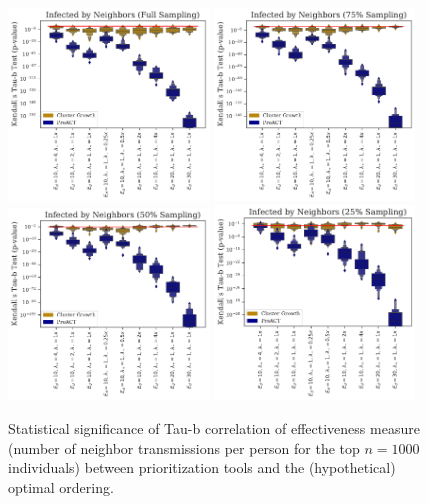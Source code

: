 \documentclass[a4paper,11pt]{article}
\begin{document}
\clearpage

\begin{figure}[!h]
\centering
\includegraphics[width=0.475\textwidth]{figs/results_efficacy_tau_pvalue_neighbors.pdf}
\includegraphics[width=0.475\textwidth]{figs/results_efficacy_tau_pvalue_neighbors_sub75.pdf}\\
\includegraphics[width=0.475\textwidth]{figs/results_efficacy_tau_pvalue_neighbors_sub50.pdf}
\includegraphics[width=0.475\textwidth]{figs/results_efficacy_tau_pvalue_neighbors_sub25.pdf}\\
\caption{{Statistical significance of Tau-b correlation of effectiveness measure (number of neighbor transmissions per person for the top $n=1000$ individuals) between prioritization tools and the (hypothetical) optimal ordering.}}\label{fig:tau-b-pvalues-neighbors}
\end{figure}
\end{document}
